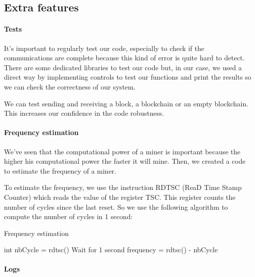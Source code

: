 \subsection{Extra features}

\paragraph{Tests}

It's important to regularly test our code, especially to check if the communications are complete because this kind of error is quite hard to detect. There are some dedicated libraries to test our code but, in our case, we used a direct way by implementing controls to test our functions and print the results so we can check the correctness of our system. \newline

We can test sending and receiving a block, a blockchain or an empty blockchain. This increases our confidence in the code robustness.

\paragraph{Frequency estimation}

We've seen that the computational power of a miner is important because the higher his computational power the faster it will mine. Then, we created a code to estimate the frequency of a miner. \newline

To estimate the frequency, we use the instruction RDTSC (ReaD Time Stamp Counter) which reads the value of the register TSC. This register counts the number of cycles since the last reset. So we use the following algorithm to compute the number of cycles in 1 second: \newline

\begin{algorithm}
  \caption{Frequency estimation}

  \begin{algorithmic}
    \STATE int nbCycle = rdtsc()
    \STATE Wait for 1 second
    \STATE frequency = rdtsc() - nbCycle
  \end{algorithmic}
\end{algorithm}
\medskip

\paragraph{Logs}

